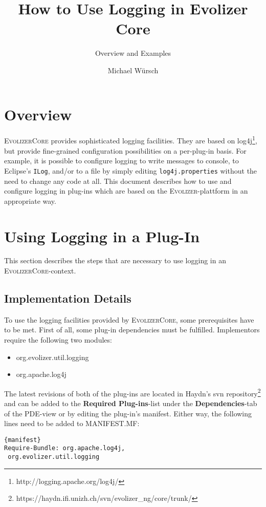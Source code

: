 \documentclass{seal_article}
\title{How to Use Logging in Evolizer Core}
\subtitle{Overview and Examples}
\author{Michael W\"{u}rsch}
\begin{document}
\maketitle

\section{Overview}
\textsc{EvolizerCore} provides sophisticated logging facilities. They are based on log4j\footnote{http://logging.apache.org/log4j/}, but provide fine-grained configuration possibilities on a per-plug-in basis. For example, it is possible to configure logging to write messages to console, to Eclipse's \texttt{ILog}, and/or to a file by simply editing \texttt{log4j.properties} without the need to change any code at all. This document describes how to use and configure logging in plug-ins which are based on the \textsc{Evolizer}-plattform in an appropriate way.

\newpage

\section{Using Logging in a Plug-In}
This section describes the steps that are necessary to use logging in an \textsc{EvolizerCore}-context.

\subsection{Implementation Details}
To use the logging facilities provided by \textsc{EvolizerCore}, some prerequisites have to be met. First of all, some plug-in dependencies must be fulfilled. Implementors require the following two modules:

\begin{itemize}
	\item{org.evolizer.util.logging}
	\item{org.apache.log4j}
\end{itemize}

The latest revisions of both of the plug-ins are located in Haydn's svn repository\footnote{https://haydn.ifi.unizh.ch/svn/evolizer\_ng/core/trunk/} and can be added to the \textbf{Required Plug-ins}-list under the \textbf{Dependencies}-tab of the PDE-view or by editing the plug-in's manifest. Either way, the following lines need to be added to MANIFEST.MF:
\\
\begin{lstlisting}[frame=tbrl, caption=META-INF/MANIFEST.MF]{manifest}
Require-Bundle: org.apache.log4j,
 org.evolizer.util.logging
\end{lstlisting}
\end{document}
